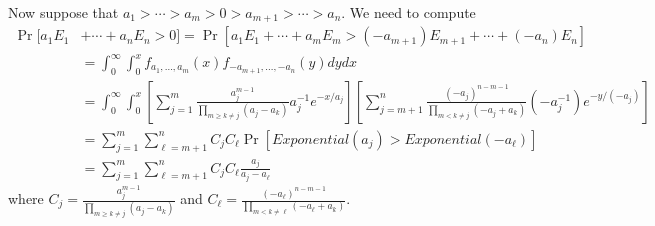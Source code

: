 \documentclass[11pt]{letter}
\begin{document}
Now suppose that $a_1 > \cdots > a_m > 0 > a_{m+1} > \cdots > a_n$.
We need to compute
\begin{align*}
\Pr[a_1 E_1 &+ \cdots + a_n E_n > 0] = \Pr[a_1 E_1 + \cdots + a_m E_m
> (-a_{m+1})E_{m+1} + \cdots + (-a_n) E_n]
\\&= \int_0^\infty \int_0^x f_{a_1,\hdots,a_m}(x)
f_{-a_{m+1},\hdots,-a_n}(y) dy dx
\\&= \int_0^\infty \int_0^x \left[\sum_{j=1}^m
  \frac{a_j^{m-1}}{\prod_{m \geq k \neq
    j}(a_j-a_k)} a_j^{-1} e^{-x/a_j} \right]\left[\sum_{j=m+1}^n
\frac{(-a_j)^{n-m-1}}{\prod_{m < k \neq
    j}(-a_j+a_k)} (-a_j^{-1})e^{-y/(-a_j)}\right]
\\&= \sum_{j=1}^m \sum_{\ell=m+1}^n C_jC_\ell
\Pr[Exponential(a_j) > Exponential(-a_\ell)]
\\&= \sum_{j=1}^m \sum_{\ell=m+1}^n C_jC_\ell \frac{a_j}{a_j-a_\ell}
\end{align*}
where $C_j = \frac{a_j^{m-1}}{\prod_{m \geq k \neq
    j}(a_j-a_k)}$ and $C_\ell = \frac{(-a_\ell)^{n-m-1}}{\prod_{m < k \neq
    \ell}(-a_\ell+a_k)}$.
\end{document}
